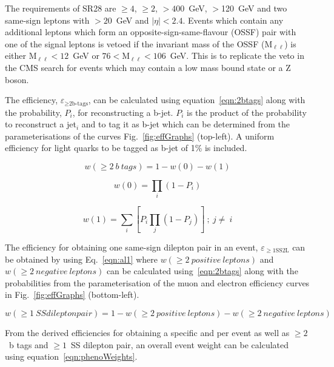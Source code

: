 The requirements of SR28 are \njets$\geq4$, \nbtags$\geq2$, \HT$>400$~GeV, \MET$>$120~GeV and two same-sign leptons with \pt$>20$~GeV and $|\eta|<2.4$. Events which contain any additional leptons which form an opposite-sign-same-flavour (OSSF) pair with one of the signal leptons is vetoed if the invariant mass of the OSSF (M$_{\ell\ell}$) is either M$_{\ell\ell}<12$~GeV or $76<$M$_{\ell\ell}<106$~GeV. This is to replicate the veto in the CMS search for events which may contain a low mass bound state or a Z boson.

The efficiency, $\varepsilon_{\geq\text{2b-tags}}$, can be calculated using equation~\ref{eqn:2btags} along with the probability, $P_{i}$, for reconstructing a b-jet. $P_{i}$ is the product of the probability to reconstruct a jet$_{i}$ and to tag it as b-jet which can be determined from the parameterisations of the curves Fig.~\ref{fig:effGraphs} (top-left). A uniform efficiency for light quarks to be tagged as b-jet of 1\% is included.


\begin{equation}
w(\geq2~b~tags) = 1 - w(0) - w(1)
\label{eqn:2btags}
\end{equation}

\begin{equation}
w(0) = \prod_{i} ( 1 - P_{i})
\label{eqn:0btags}
\end{equation}


\begin{equation}
w(1) = \sum_{i}\left[P_{i}\prod_{j} ( 1 - P_{j})\right]~;~j\neq~i
\label{eqn:1btags}
\end{equation}

The efficiency for obtaining one same-sign dilepton pair in an event, $\varepsilon_{\geq1 \text{SS2L}}$ can be obtained by using Eq.~\ref{eqn:al1} where $w(\geq2~positive~leptons)$ and $w(\geq2~negative~leptons)$ can be calculated using~\ref{eqn:2btags} along with the probabilities from the parameterisation of the muon and electron efficiency curves in Fig.~\ref{fig:effGraphs} (bottom-left).

\begin{equation}
w(\geq1~SS dilepton pair) = 1 - w(\geq2~positive~leptons) - w(\geq2~negative~leptons)
\label{eqn:al1}
\end{equation}

From the derived efficiencies for obtaining a specific \HT and \MET per event as well as $\geq2$~b tags and $\geq1$~SS dilepton pair, an overall event weight can be calculated using equation~\ref{eqn:phenoWeights}.

